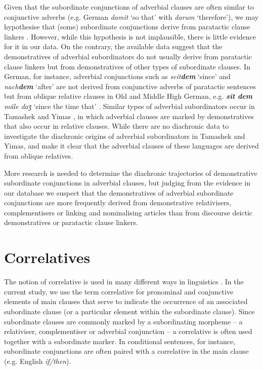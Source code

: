 \documentclass[output=paper,colorlinks,citecolor=brown]{langscibook}
\begin{document}
Given that the subordinate conjunctions of adverbial clauses are often similar to conjunctive adverbs (e.g. German \textit{damit} ‘so that’ with \textit{darum} ‘therefore’), we may hypothesise that (some) subordinate conjunctions derive from paratactic clause linkers \citep[185]{HopperTraugott2003}. However, while this hypothesis is not implausible, there is little evidence for it in our data. On the contrary, the available data suggest that the demonstratives of adverbial subordinators do not usually derive from paratactic clause linkers but from demonstratives of other types of subordinate clauses. In German, for instance, adverbial conjunctions such as \textit{seit\textbf{dem}} ‘since’ and \textit{nach\textbf{dem}} ‘after’ are not derived from conjunctive adverbs of paratactic sentences but from oblique relative clauses in Old and Middle High German, e.g. \textit{\textbf{sît dem} mâle daʒ} ‘since the time that’ \citep[238]{Lockwood1968}. Similar types of adverbial subordinators occur in Tamashek \citep{Heath2005} and Yimas \citep{Foley1991}, in which adverbial clauses are marked by demonstratives that also occur in relative clauses. While there are no diachronic data to investigate the diachronic origins of adverbial subordinators in Tamashek and Yimas, \citet[663-675]{Heath2005} and \citet[435-444]{Foley1991} make it clear that the adverbial clauses of these languages are derived from oblique relatives. 

More research is needed to determine the diachronic trajectories of demonstrative subordinate conjunctions in adverbial clauses, but judging from the evidence in our database we suspect that the demonstratives of adverbial subordinate conjunctions are more frequently derived from demonstrative relativisers, complementisers or linking and nominalising articles than from discourse deictic demonstratives or paratactic clause linkers. 

\section{Correlatives}\label{sec:diessel:8}

The notion of correlative is used in many different ways in linguistics \citep{Lipták2009}. In the current study, we use the term correlative for pronominal and conjunctive elements of main clauses that serve to indicate the occurrence of an associated subordinate clause (or a particular element within the subordinate clause). Since subordinate clauses are commonly marked by a subordinating morpheme – a relativiser, complementiser or adverbial conjunction – a correlative is often used together with a subordinate marker. In conditional sentences, for instance, subordinate conjunctions are often paired with a correlative in the main clause (e.g. English \textit{if/then}).
\end{document}
